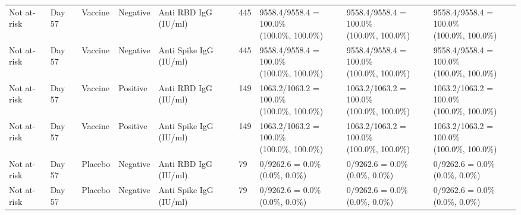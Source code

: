 \documentclass[]{book}
\theoremstyle{definition}
\theoremstyle{definition}
\theoremstyle{definition}
\newcommand{\1}{\mathbbm{1}}
\begin{document}
\begin{landscape}
\begin{ThreePartTable}
\begin{longtable}[t]{>{\raggedright\arraybackslash}p{2.7cm}llllllll}
\hspace{1em}Not at-risk & Day 57 & Vaccine & Negative & Anti RBD IgG (IU/ml) & 445 & \makecell[l]{9558.4/9558.4 = 100.0\%\\(100.0\%, 100.0\%)} & \makecell[l]{9558.4/9558.4 = 100.0\%\\(100.0\%, 100.0\%)} & \makecell[l]{9558.4/9558.4 = 100.0\%\\(100.0\%, 100.0\%)}\\
\hspace{1em}Not at-risk & Day 57 & Vaccine & Negative & Anti Spike IgG (IU/ml) & 445 & \makecell[l]{9558.4/9558.4 = 100.0\%\\(100.0\%, 100.0\%)} & \makecell[l]{9558.4/9558.4 = 100.0\%\\(100.0\%, 100.0\%)} & \makecell[l]{9558.4/9558.4 = 100.0\%\\(100.0\%, 100.0\%)}\\
\hspace{1em}Not at-risk & Day 57 & Vaccine & Positive & Anti RBD IgG (IU/ml) & 149 & \makecell[l]{1063.2/1063.2 = 100.0\%\\(100.0\%, 100.0\%)} & \makecell[l]{1063.2/1063.2 = 100.0\%\\(100.0\%, 100.0\%)} & \makecell[l]{1063.2/1063.2 = 100.0\%\\(100.0\%, 100.0\%)}\\
\hspace{1em}Not at-risk & Day 57 & Vaccine & Positive & Anti Spike IgG (IU/ml) & 149 & \makecell[l]{1063.2/1063.2 = 100.0\%\\(100.0\%, 100.0\%)} & \makecell[l]{1063.2/1063.2 = 100.0\%\\(100.0\%, 100.0\%)} & \makecell[l]{1063.2/1063.2 = 100.0\%\\(100.0\%, 100.0\%)}\\
\hspace{1em}Not at-risk & Day 57 & Placebo & Negative & Anti RBD IgG (IU/ml) & 79 & \makecell[l]{0/9262.6 = 0.0\%\\(0.0\%, 0.0\%)} & \makecell[l]{0/9262.6 = 0.0\%\\(0.0\%, 0.0\%)} & \makecell[l]{0/9262.6 = 0.0\%\\(0.0\%, 0.0\%)}\\
\hspace{1em}Not at-risk & Day 57 & Placebo & Negative & Anti Spike IgG (IU/ml) & 79 & \makecell[l]{0/9262.6 = 0.0\%\\(0.0\%, 0.0\%)} & \makecell[l]{0/9262.6 = 0.0\%\\(0.0\%, 0.0\%)} & \makecell[l]{0/9262.6 = 0.0\%\\(0.0\%, 0.0\%)}\\

\end{longtable}
\end{ThreePartTable}
\end{landscape}
\end{document}
